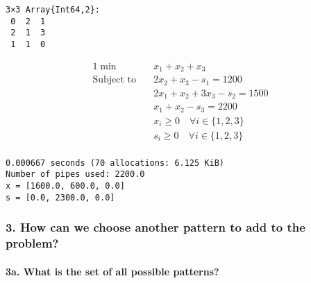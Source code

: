     
    \begin{verbatim}
3×3 Array{Int64,2}:
 0  2  1
 2  1  3
 1  1  0
    \end{verbatim}

    
\begin{equation} \begin{split}{1}\min\quad & x_{1} + x_{2} + x_{3}\\
\text{Subject to} \quad & 2 x_{2} + x_{3} - s_{1} = 1200\\
 & 2 x_{1} + x_{2} + 3 x_{3} - s_{2} = 1500\\
 & x_{1} + x_{2} - s_{3} = 2200\\
 & x_{i} \geq 0 \quad\forall i \in \{1,2,3\}\\
 & s_{i} \geq 0 \quad\forall i \in \{1,2,3\}\\
\end{split}
\end{equation}

    
    \begin{Verbatim}[commandchars=\\\{\}]
  0.000667 seconds (70 allocations: 6.125 KiB)
Number of pipes used: 2200.0
x = [1600.0, 600.0, 0.0]
s = [0.0, 2300.0, 0.0]

    \end{Verbatim}

    \hypertarget{how-can-we-choose-another-pattern-to-add-to-the-problem}{%
\subsubsection{3. How can we choose another pattern to add to the
problem?}\label{how-can-we-choose-another-pattern-to-add-to-the-problem}}

    \hypertarget{a.-what-is-the-set-of-all-possible-patterns}{%
\paragraph{3a. What is the set of all possible
patterns?}\label{a.-what-is-the-set-of-all-possible-patterns}}

